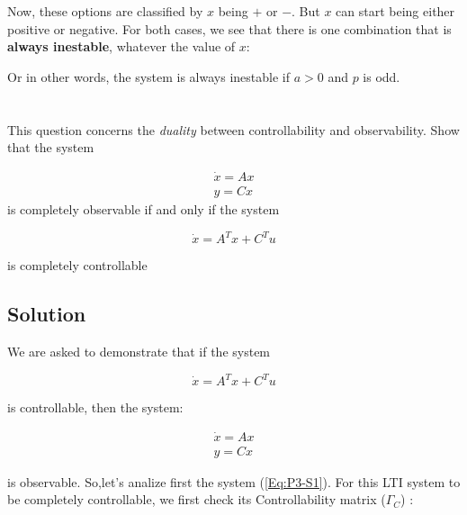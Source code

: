 \documentclass[10pt,a4paper]{article}
\begin{document}
Now, these options are classified by $x$ being $+$ or $-$. But $x$ can start being either positive or negative. For both cases, we see that there is one combination that is \textbf{always inestable}, whatever the value of $x$:

\begin{center}
\end{center}

Or in other words, the system is always inestable if $a > 0$ and $p$ is odd.

\section{}
This question concerns the \textit{duality} between controllability and observability. Show that the system

\[
\begin{matrix}
\dot{x} = Ax \\
y = Cx
\end{matrix}
\]
is completely observable if and only if the system

\[ \dot{x} = A^{T}x + C^{T}u \]

is completely controllable

\subsection*{Solution}

We are asked to demonstrate that if the system

\begin{equation} 
\dot{x} = A^{T}x + C^{T}u
\label{Eq:P3-S1} 
\end{equation}

is controllable, then the system:

\begin{equation}
\begin{matrix}
\dot{x} = Ax \\
y = Cx
\end{matrix}
\label{Eq:P3-S2}
\end{equation}

is observable. So,let's analize first the system (\ref{Eq:P3-S1}). For this LTI system to be completely controllable, we first check its Controllability matrix ($\Gamma_{C}$) :
\end{document}
